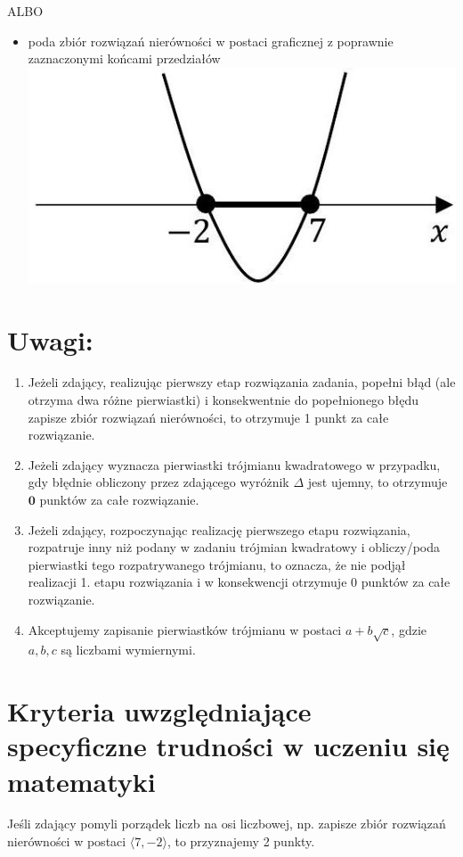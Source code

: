 \documentclass[10pt]{article}
\begin{document}
ALBO

\begin{itemize}
  \item poda zbiór rozwiązań nierówności w postaci graficznej z poprawnie zaznaczonymi końcami przedziałów\\
\includegraphics[max width=\textwidth, center]{2025_02_07_6828143ce1e2fe8e0865g-12}
\end{itemize}

\section*{Uwagi:}
\begin{enumerate}
  \item Jeżeli zdający, realizując pierwszy etap rozwiązania zadania, popełni błąd (ale otrzyma dwa różne pierwiastki) i konsekwentnie do popełnionego błędu zapisze zbiór rozwiązań nierówności, to otrzymuje 1 punkt za całe rozwiązanie.
  \item Jeżeli zdający wyznacza pierwiastki trójmianu kwadratowego w przypadku, gdy błędnie obliczony przez zdającego wyróżnik $\Delta$ jest ujemny, to otrzymuje $\mathbf{0}$ punktów za całe rozwiązanie.
  \item Jeżeli zdający, rozpoczynając realizację pierwszego etapu rozwiązania, rozpatruje inny niż podany w zadaniu trójmian kwadratowy i obliczy/poda pierwiastki tego rozpatrywanego trójmianu, to oznacza, że nie podjął realizacji 1. etapu rozwiązania i w konsekwencji otrzymuje 0 punktów za całe rozwiązanie.
  \item Akceptujemy zapisanie pierwiastków trójmianu w postaci $a+b \sqrt{c}$, gdzie $a, b, c$ są liczbami wymiernymi.
\end{enumerate}

\section*{Kryteria uwzględniające specyficzne trudności w uczeniu się matematyki}
Jeśli zdający pomyli porządek liczb na osi liczbowej, np. zapisze zbiór rozwiązań nierówności w postaci $\langle 7,-2\rangle$, to przyznajemy 2 punkty.
\end{document}

